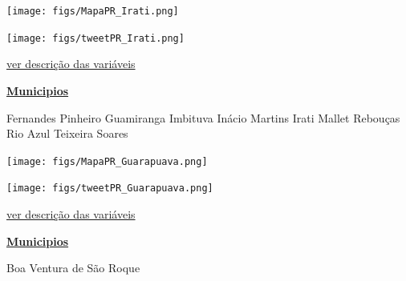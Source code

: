 \documentclass[10pt]{article} %
\begin{document}
\begin{minipage}[t]{.66\linewidth}
\hypertarget{Irat}{}
\texttt{[image: figs/MapaPR\_Irati.png]}\vspace{0.5cm}\vspace{0.5cm}\begin{center}
\texttt{[image: figs/tweetPR\_Irati.png]}\end{center}
\begin{center}

\end{center}
\small{\hyperlink{vartab}{ver descrição das variáveis}}\end{minipage}\hfill\begin{minipage}[t]{.30\linewidth}
\begin{mdframed}[style=sidebar,frametitle={}]
\textbf{\hyperlink{municips}{Municipios}}\begin{itemize}\gsquare Fernandes Pinheiro 
\gsquare Guamiranga 
\gsquare Imbituva 
\gsquare Inácio Martins 
\gsquare Irati 
\gsquare Mallet 
\gsquare Rebouças 
\gsquare Rio Azul 
\gsquare Teixeira Soares 
\end{itemize}\BackToContents\end{mdframed}\hfill\end{minipage}\newpage\begin{minipage}[t]{.66\linewidth}
\hypertarget{Grpv}{}
\texttt{[image: figs/MapaPR\_Guarapuava.png]}\vspace{0.5cm}\vspace{0.5cm}\begin{center}
\texttt{[image: figs/tweetPR\_Guarapuava.png]}\end{center}
\begin{center}

\end{center}
\small{\hyperlink{vartab}{ver descrição das variáveis}}\end{minipage}\hfill\begin{minipage}[t]{.30\linewidth}
\begin{mdframed}[style=sidebar,frametitle={}]
\textbf{\hyperlink{municips}{Municipios}}\begin{itemize}\gsquare Boa Ventura de São Roque 

\end{itemize}
\end{mdframed}
\end{minipage}
\end{document}
